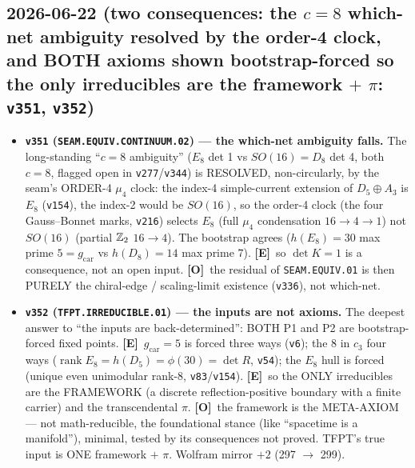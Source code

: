 \documentclass[11pt]{article}
\providecommand{\mE}{\textbf{[E]}}\providecommand{\mC}{\textbf{[C]}}
\providecommand{\mO}{\textbf{[O]}}\providecommand{\mX}{\textbf{[X]}}
\providecommand{\vref}[1]{\texttt{#1}}
\providecommand{\cthree}{c_3}\providecommand{\phiz}{\varphi_0^{\mathrm{ret}}}
\providecommand{\gcar}{g_{\mathrm{car}}}\providecommand{\Nfam}{N_{\mathrm{fam}}}
\begin{document}
\subsection*{2026-06-22 (two consequences: the $c{=}8$ which-net ambiguity resolved by the order-4 clock, and BOTH axioms shown bootstrap-forced so the only irreducibles are the framework $+$ $\pi$: \texttt{v351}, \texttt{v352})}
\begin{itemize}
\item \textbf{\texttt{v351} (\texttt{SEAM.EQUIV.CONTINUUM.02}) --- the which-net ambiguity falls.} The
long-standing ``$c{=}8$ ambiguity'' ($E_8$ det 1 vs $SO(16){=}D_8$ det 4, both $c{=}8$, flagged open in
\vref{v277}/\vref{v344}) is RESOLVED, non-circularly, by the seam's ORDER-4 $\mu_4$ clock: the index-4 simple-current
extension of $D_5\!\oplus\!A_3$ is $E_8$ (\vref{v154}), the index-2 would be $SO(16)$, so the order-4 clock (the
four Gauss--Bonnet marks, \vref{v216}) selects $E_8$ (full $\mu_4$ condensation $16{\to}4{\to}1$) not $SO(16)$
(partial $\mathbb{Z}_2$ $16{\to}4$). The bootstrap agrees ($h(E_8){=}30$ max prime $5{=}\gcar$ vs $h(D_8){=}14$ max prime
$7$). \mE\ so $\det K{=}1$ is a consequence, not an open input. \mO\ the residual of \texttt{SEAM.EQUIV.01} is then
PURELY the chiral-edge / scaling-limit existence (\vref{v336}), not which-net.
\item \textbf{\texttt{v352} (\texttt{TFPT.IRREDUCIBLE.01}) --- the inputs are not axioms.} The deepest answer to
``the inputs are back-determined'': BOTH P1 and P2 are bootstrap-forced fixed points. \mE\ $\gcar{=}5$ is forced
three ways (\vref{v6}); the $8$ in $\cthree$ four ways ($\operatorname{rank}E_8=h(D_5)=\phi(30)=\det R$, \vref{v54});
the $E_8$ hull is forced (unique even unimodular rank-8, \vref{v83}/\vref{v154}). \mE\ so the ONLY irreducibles are
the FRAMEWORK (a discrete reflection-positive boundary with a finite carrier) and the transcendental $\pi$. \mO\ the
framework is the META-AXIOM --- not math-reducible, the foundational stance (like ``spacetime is a manifold''),
minimal, tested by its consequences not proved. TFPT's true input is ONE framework $+$ $\pi$. Wolfram mirror $+2$
(297 $\to$ 299).
\end{itemize}
\end{document}
